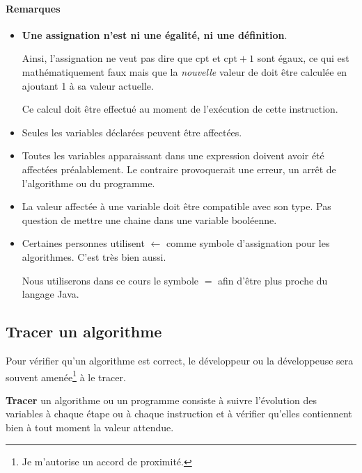 			\paragraph{Remarques}
			
				\begin{itemize}
				\item 
					\textbf{Une assignation n’est ni une égalité, 
					ni une définition}.
					
					Ainsi, l’assignation  ne veut pas dire
					que $\textrm{cpt}$ et $\textrm{cpt} + 1$ sont égaux, ce qui
					est mathématiquement faux mais que la \emph{nouvelle} valeur
					de  doit être calculée en ajoutant 1 à sa valeur
					actuelle.  
					
					Ce calcul doit être effectué au moment de l'exécution
					de cette instruction. 
				
				\item 
					Seules les variables déclarées peuvent être affectées.
				\item 
					Toutes les variables apparaissant dans une expression
					doivent avoir été affectées préalablement. 
					Le contraire provoquerait une erreur,
					un arrêt de l’algorithme ou du programme.
				\item 
					La valeur affectée à une variable 
					doit être compatible avec son type.
					Pas question de mettre une chaine dans une variable
					booléenne.
				\item 
					Certaines personnes utilisent \textbf{$\leftarrow$} comme 
					symbole d'assignation pour les algorithmes. C'est très bien 
					aussi. 

					Nous utiliserons dans ce cours le symbole $=$ afin d'être plus
					proche du langage Java. 
				\end{itemize}
				
				\subsection{Tracer un algorithme}\label{tracer}
		
			Pour vérifier qu’un algorithme est correct, le développeur ou la
			développeuse sera souvent amenée\footnote{Je m'autorise un accord de
			proximité.} à le tracer.

			\textbf{Tracer} un algorithme ou un programme consiste à suivre
			l’évolution des variables à chaque étape ou à chaque instruction
			et à vérifier qu’elles contiennent bien à tout moment la valeur
			attendue.

